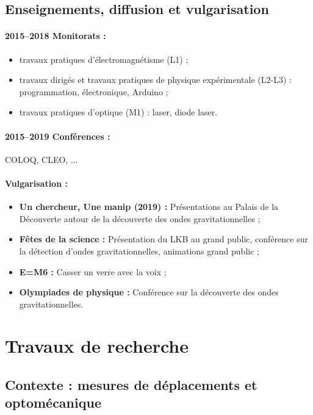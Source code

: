 \documentclass[12pt,a4paper]{article}
\begin{document}
\subsection{Enseignements, diffusion et vulgarisation}

\paragraph{2015--2018 Monitorats :}
\begin{itemize}
\item travaux pratiques d'électromagnétisme (L1) ;
\item travaux dirigés et travaux pratiques de physique expérimentale (L2-L3) : programmation, électronique, Arduino ;
\item travaux pratiques d'optique (M1) : laser, diode laser.
\end{itemize}

\paragraph{2015--2019 Conférences :} COLOQ, CLEO, ... 

\paragraph{Vulgarisation :}
\begin{itemize}
\item \textbf{Un chercheur, Une manip (2019) :} Présentations au Palais de la Découverte autour de la découverte des ondes gravitationnelles ;
\item \textbf{Fêtes de la science :} Présentation du LKB au grand public, conférence sur la détection d'ondes gravitationnelles, animations grand public ;
\item \textbf{E=M6 :} Casser un verre avec la voix ;
\item \textbf{Olympiades de physique :} Conférence sur la découverte des ondes gravitationnelles.
\end{itemize}

\section{Travaux de recherche}

\subsection{Contexte : mesures de déplacements et optomécanique}
\end{document}
